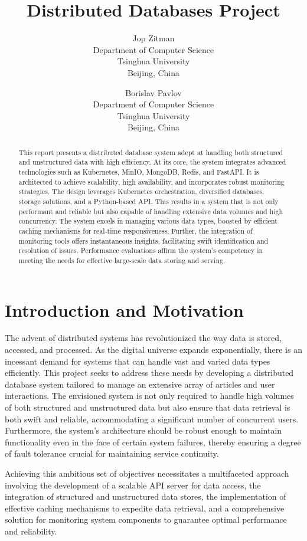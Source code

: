 \documentclass{report}
\title{Distributed Databases Project}
\author{
    Jop Zitman\\
    Department of Computer Science\\
    Tsinghua University\\
    Beijing, China \\
    \and
    Borislav Pavlov\\
    Department of Computer Science\\
    Tsinghua University\\
    Beijing, China \\
}
\begin{document}
    \maketitle

    \begin{abstract}
        This report presents a distributed database system adept at handling both structured and unstructured data with high efficiency. At its core, the system integrates advanced technologies such as Kubernetes, MinIO, MongoDB, Redis, and FastAPI. It is architected to achieve scalability, high availability, and incorporates robust monitoring strategies. The design leverages Kubernetes orchestration, diversified databases, storage solutions, and a Python-based API. This results in a system that is not only performant and reliable but also capable of handling extensive data volumes and high concurrency. The system excels in managing various data types, boosted by efficient caching mechanisms for real-time responsiveness. Further, the integration of monitoring tools offers instantaneous insights, facilitating swift identification and resolution of issues. Performance evaluations affirm the system's competency in meeting the needs for effective large-scale data storing and serving.
    \end{abstract}

    \tableofcontents
    \pagebreak

    \section{Introduction and Motivation}
    The advent of distributed systems has revolutionized the way data is stored, accessed, and processed. As the digital universe expands exponentially, there is an incessant demand for systems that can handle vast and varied data types efficiently. This project seeks to address these needs by developing a distributed database system tailored to manage an extensive array of articles and user interactions. The envisioned system is not only required to handle high volumes of both structured and unstructured data but also ensure that data retrieval is both swift and reliable, accommodating a significant number of concurrent users. Furthermore, the system's architecture should be robust enough to maintain functionality even in the face of certain system failures, thereby ensuring a degree of fault tolerance crucial for maintaining service continuity.

    Achieving this ambitious set of objectives necessitates a multifaceted approach involving the development of a scalable API server for data access, the integration of structured and unstructured data stores, the implementation of effective caching mechanisms to expedite data retrieval, and a comprehensive solution for monitoring system components to guarantee optimal performance and reliability.
\end{document}
